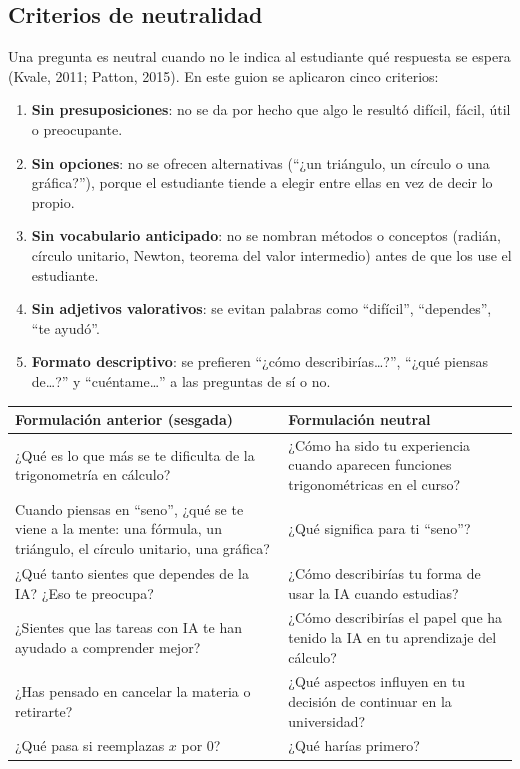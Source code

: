 \documentclass[11pt,letterpaper]{article}
\newcounter{preg}
\begin{document}
\subsection{Criterios de neutralidad}\label{sec:neutralidad}
Una pregunta es neutral cuando no le indica al estudiante qué respuesta se espera (Kvale, 2011; Patton, 2015). En este guion se aplicaron cinco criterios:
\begin{enumerate}
  \item \textbf{Sin presuposiciones}: no se da por hecho que algo le resultó difícil, fácil, útil o preocupante.
  \item \textbf{Sin opciones}: no se ofrecen alternativas (``¿un triángulo, un círculo o una gráfica?''), porque el estudiante tiende a elegir entre ellas en vez de decir lo propio.
  \item \textbf{Sin vocabulario anticipado}: no se nombran métodos o conceptos (radián, círculo unitario, Newton, teorema del valor intermedio) antes de que los use el estudiante.
  \item \textbf{Sin adjetivos valorativos}: se evitan palabras como ``difícil'', ``dependes'', ``te ayudó''.
  \item \textbf{Formato descriptivo}: se prefieren ``¿cómo describirías\ldots?'', ``¿qué piensas de\ldots?'' y ``cuéntame\ldots'' a las preguntas de sí o no.
\end{enumerate}

\begin{center}
\small
\begin{tabularx}{\linewidth}{@{}LL@{}}
\toprule
\textbf{Formulación anterior (sesgada)} & \textbf{Formulación neutral}\\
\midrule
¿Qué es lo que más se te dificulta de la trigonometría en cálculo? & ¿Cómo ha sido tu experiencia cuando aparecen funciones trigonométricas en el curso?\\
Cuando piensas en ``seno'', ¿qué se te viene a la mente: una fórmula, un triángulo, el círculo unitario, una gráfica? & ¿Qué significa para ti ``seno''?\\
¿Qué tanto sientes que dependes de la IA? ¿Eso te preocupa? & ¿Cómo describirías tu forma de usar la IA cuando estudias?\\
¿Sientes que las tareas con IA te han ayudado a comprender mejor? & ¿Cómo describirías el papel que ha tenido la IA en tu aprendizaje del cálculo?\\
¿Has pensado en cancelar la materia o retirarte? & ¿Qué aspectos influyen en tu decisión de continuar en la universidad?\\
¿Qué pasa si reemplazas $x$ por 0? & ¿Qué harías primero?\\
\bottomrule
\end{tabularx}
\end{center}
\end{document}
